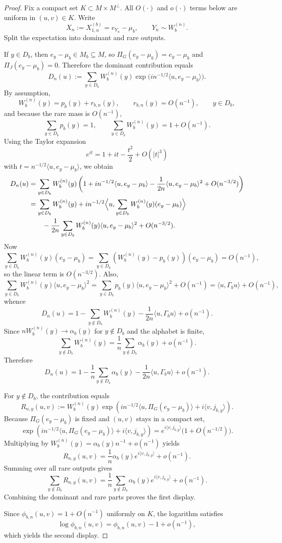 \documentclass{article}
\newcommand{\1}{\mathbf 1}
\begin{document}
\begin{proof}
Fix a compact set $K\subset M\times M^\perp$. All $O(\cdot)$ and $o(\cdot)$ terms below are uniform in $(u,v)\in K$.
Write
\[
X_n:=X^{(b)}_{1,n}=e_{Y_n}-\mu_b,
\qquad Y_n\sim W_b^{(n)}.
\]
Split the expectation into dominant and rare outputs.

If $y\in D_b$, then $e_y-\mu_b\in M_b\subseteq M$, so $\Pi_G(e_y-\mu_b)=e_y-\mu_b$ and
$\Pi_J(e_y-\mu_b)=0$. Therefore the dominant contribution equals
\[
D_n(u):=\sum_{y\in D_b} W_b^{(n)}(y)\exp\!\bigl(i n^{-1/2}\langle u,e_y-\mu_b\rangle\bigr).
\]
By assumption,
\[
W_b^{(n)}(y)=p_b(y)+r_{b,n}(y),\qquad r_{b,n}(y)=O(n^{-1}),\qquad y\in D_b,
\]
and because the rare mass is $O(n^{-1})$,
\[
\sum_{y\in D_b}p_b(y)=1,
\qquad
\sum_{y\in D_b}W_b^{(n)}(y)=1+O(n^{-1}).
\]
Using the Taylor expansion
\[
e^{it}=1+it-\frac{t^2}{2}+O(|t|^3)
\]
with $t=n^{-1/2}\langle u,e_y-\mu_b\rangle$, we obtain
\begin{align*}
D_n(u)
&=
\sum_{y\in D_b} W_b^{(n)}(y)
\left(1+i n^{-1/2}\langle u,e_y-\mu_b\rangle-
\frac{1}{2n}\langle u,e_y-\mu_b\rangle^2+O(n^{-3/2})\right) \\
&=
\sum_{y\in D_b}W_b^{(n)}(y)
+i n^{-1/2}\Bigl\langle u,\sum_{y\in D_b}W_b^{(n)}(y)(e_y-\mu_b)\Bigr\rangle \\
&\qquad-
\frac{1}{2n}\sum_{y\in D_b}W_b^{(n)}(y)\langle u,e_y-\mu_b\rangle^2+O(n^{-3/2}).
\end{align*}
Now
\[
\sum_{y\in D_b}W_b^{(n)}(y)(e_y-\mu_b)
=
\sum_{y\in D_b}(W_b^{(n)}(y)-p_b(y))(e_y-\mu_b)=O(n^{-1}),
\]
so the linear term is $O(n^{-3/2})$. Also,
\[
\sum_{y\in D_b}W_b^{(n)}(y)\langle u,e_y-\mu_b\rangle^2
=
\sum_{y\in D_b}p_b(y)\langle u,e_y-\mu_b\rangle^2+O(n^{-1})
=\langle u,\Gamma_bu\rangle+O(n^{-1}),
\]
whence
\[
D_n(u)=1-\sum_{y\notin D_b}W_b^{(n)}(y)-\frac{1}{2n}\langle u,\Gamma_bu\rangle+o(n^{-1}).
\]
Since $nW_b^{(n)}(y)\to\alpha_b(y)$ for $y\notin D_b$ and the alphabet is finite,
\[
\sum_{y\notin D_b}W_b^{(n)}(y)=\frac{1}{n}\sum_{y\notin D_b}\alpha_b(y)+o(n^{-1}).
\]
Therefore
\[
D_n(u)=1-\frac{1}{n}\sum_{y\notin D_b}\alpha_b(y)-\frac{1}{2n}\langle u,\Gamma_bu\rangle+o(n^{-1}).
\]

For $y\notin D_b$, the contribution equals
\[
R_{n,y}(u,v):=W_b^{(n)}(y)
\exp\!\left(i n^{-1/2}\langle u,\Pi_G(e_y-\mu_b)\rangle+i\langle v,j_{b,y}\rangle\right).
\]
Because $\Pi_G(e_y-\mu_b)$ is fixed and $(u,v)$ stays in a compact set,
\[
\exp\!\left(i n^{-1/2}\langle u,\Pi_G(e_y-\mu_b)\rangle+i\langle v,j_{b,y}\rangle\right)
=
 e^{i\langle v,j_{b,y}\rangle}\bigl(1+O(n^{-1/2})\bigr).
\]
Multiplying by $W_b^{(n)}(y)=\alpha_b(y)n^{-1}+o(n^{-1})$ yields
\[
R_{n,y}(u,v)=\frac{1}{n}\alpha_b(y)e^{i\langle v,j_{b,y}\rangle}+o(n^{-1}).
\]
Summing over all rare outputs gives
\[
\sum_{y\notin D_b}R_{n,y}(u,v)
=
\frac{1}{n}\sum_{y\notin D_b}\alpha_b(y)e^{i\langle v,j_{b,y}\rangle}+o(n^{-1}).
\]
Combining the dominant and rare parts proves the first display.

Since $\phi_{b,n}(u,v)=1+O(n^{-1})$ uniformly on $K$, the logarithm satisfies
\[
\log\phi_{b,n}(u,v)=\phi_{b,n}(u,v)-1+o(n^{-1}),
\]
which yields the second display.
\end{proof}
\end{document}

